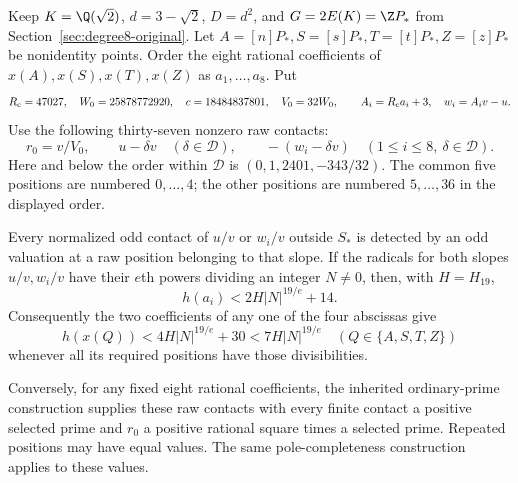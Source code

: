 \begin{lemma}
\label{lem:quartic-rational37}
Keep $K=\Q(\sqrt2)$, $d=3-\sqrt2$, $D=d^2$, and
$G=2E(K)=\Z P_*$ from Section~\ref{sec:degree8-original}.
Let $A=[n]P_*,S=[s]P_*,T=[t]P_*,Z=[z]P_*$ be nonidentity points.
Order the eight rational coefficients of
$x(A),x(S),x(T),x(Z)$ as $a_1,\ldots,a_8$. Put
\[
 R_{\rm c}=47027,\quad W_0=25878772920,\quad c=18484837801,
 \quad V_0=32W_0,
 \qquad A_i=R_{\rm c}a_i+3,\quad w_i=A_iv-u.
\]
Use the following thirty-seven nonzero raw contacts:
\begin{equation}\label{eq:quartic-contacts37}
 r_0=v/V_0,\qquad u-\delta v\quad(\delta\in\mathcal D),
 \qquad -(w_i-\delta v)\quad(1\le i\le8,\ \delta\in\mathcal D).
\end{equation}
Here and below the order within $\mathcal D$ is
$(0,1,2401,-343/32)$. The common five positions are numbered $0,\ldots,4$;
the other positions are numbered $5,\ldots,36$ in the displayed order.

Every normalized odd contact of $u/v$ or $w_i/v$ outside $S_*$ is
detected by an odd valuation at a raw position belonging to that slope.
If the radicals for both slopes $u/v,w_i/v$ have their $e$th powers
dividing an integer $N\ne0$, then, with $H=H_{19}$,
\[
 h(a_i)<2H|N|^{19/e}+14.
\]
Consequently the two coefficients of any one of the four abscissas give
\begin{equation}\label{eq:quartic-direct-height}
 h(x(Q))<4H|N|^{19/e}+30<7H|N|^{19/e}
 \quad(Q\in\{A,S,T,Z\})
\end{equation}
whenever all its required positions have those divisibilities.

Conversely, for any fixed eight rational coefficients, the inherited
ordinary-prime construction supplies these raw contacts with every finite
contact a positive selected prime and $r_0$ a positive rational square
times a selected prime. Repeated positions may have equal values.
The same pole-completeness construction applies to these values.
\end{lemma}
